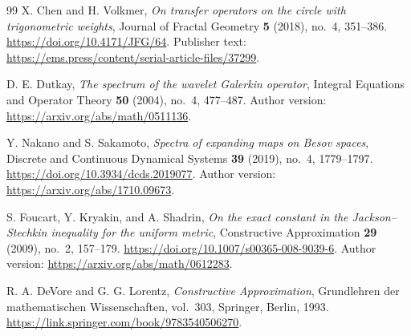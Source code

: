 \documentclass[11pt,a4paper]{article}
\numberwithin{equation}{section}
\theoremstyle{definition}
\theoremstyle{remark}
\begin{document}
\begin{thebibliography}{99}
X. Chen and H. Volkmer,
\emph{On transfer operators on the circle with trigonometric weights},
Journal of Fractal Geometry \textbf{5} (2018), no.~4, 351--386.
\url{https://doi.org/10.4171/JFG/64}.
Publisher text: \url{https://ems.press/content/serial-article-files/37299}.

D. E. Dutkay, \emph{The spectrum of the wavelet Galerkin operator},
Integral Equations and Operator Theory \textbf{50} (2004), no.~4,
477--487. Author version:
\url{https://arxiv.org/abs/math/0511136}.

Y. Nakano and S. Sakamoto,
\emph{Spectra of expanding maps on Besov spaces},
Discrete and Continuous Dynamical Systems \textbf{39} (2019),
no.~4, 1779--1797.
\url{https://doi.org/10.3934/dcds.2019077}.
Author version: \url{https://arxiv.org/abs/1710.09673}.

S. Foucart, Y. Kryakin, and A. Shadrin,
\emph{On the exact constant in the Jackson--Stechkin inequality for
the uniform metric}, Constructive Approximation \textbf{29} (2009),
no.~2, 157--179.
\url{https://doi.org/10.1007/s00365-008-9039-6}.
Author version: \url{https://arxiv.org/abs/math/0612283}.

R. A. DeVore and G. G. Lorentz,
\emph{Constructive Approximation}, Grundlehren der mathematischen
Wissenschaften, vol.~303, Springer, Berlin, 1993.
\url{https://link.springer.com/book/9783540506270}.

\end{thebibliography}
\end{document}
